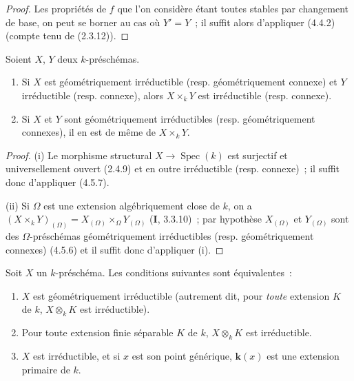 \begin{proof}
Les propriétés de $f$ que l'on considère étant toutes stables par changement
de base, on peut se borner au cas où $Y'=Y$~; il suffit alors d'appliquer
(4.4.2) (compte tenu de (2.3.12)).
\end{proof}

\begin{corollary}[4.5.8]
\label{IV.2.4.5.8-fr}
Soient $X$, $Y$ deux $k$-préschémas.
\begin{enumerate}
\item[\textup{(i)}] Si $X$ est géométriquement irréductible \textup{(resp.} géométriquement
connexe\textup{)} et $Y$ irréductible \textup{(resp.} connexe\textup{)}, alors $X\times_k Y$ est
irréductible \textup{(resp.} connexe\textup{)}.
\item[\textup{(ii)}] Si $X$ et $Y$ sont géométriquement irréductibles \textup{(resp.}
géométriquement connexes\textup{)}, il en est de même de $X\times_k Y$.
\end{enumerate}
\end{corollary}

\begin{proof}
(i) Le morphisme structural $X\to\operatorname{Spec}(k)$ est surjectif et
universellement ouvert (2.4.9) et en outre irréductible (resp. connexe)~; il
suffit donc d'appliquer (4.5.7).

(ii) Si $\Omega$ est une extension algébriquement close de $k$, on a
$(X\times_k Y)_{(\Omega)}=X_{(\Omega)}\times_\Omega Y_{(\Omega)}$
(\textbf{I}, 3.3.10)~; par hypothèse $X_{(\Omega)}$ et $Y_{(\Omega)}$ sont des
$\Omega$-préschémas géométriquement irréductibles (resp. géométriquement
connexes) (4.5.6) et il suffit donc d'appliquer (i).
\end{proof}

\begin{proposition}[4.5.9]
\label{IV.2.4.5.9-fr}
Soit $X$ un $k$-préschéma. Les conditions suivantes sont équivalentes~:
\begin{enumerate}
\item[\textup{a)}] $X$ est géométriquement irréductible \textup{(autrement dit, pour \emph{toute}
extension $K$ de $k$, $X\otimes_k K$ est irréductible)}.
\item[\textup{b)}] Pour toute extension finie séparable $K$ de $k$, $X\otimes_k K$
est irréductible.
\item[\textup{c)}] $X$ est irréductible, et si $x$ est son point générique, $\boldsymbol{k}(x)$
est une extension primaire de $k$.
\end{enumerate}
\end{proposition}

